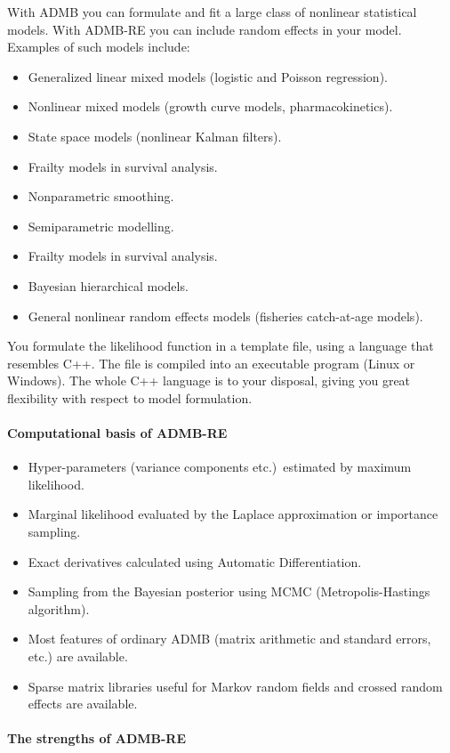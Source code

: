 \documentclass[12pt,letter,reqno]{book}
\begin{document}
With ADMB you can formulate and fit a large class of nonlinear statistical
models. With ADMB-RE you can include random effects in your model. Examples of such models include:
\begin{itemize}
\item Generalized linear mixed models (logistic and Poisson regression).
\item Nonlinear mixed models (growth curve models, pharmacokinetics).
\item State space models (nonlinear Kalman filters).
\item Frailty models in survival analysis.
\item Nonparametric smoothing.
\item Semiparametric modelling.
\item Frailty models in survival analysis.
\item Bayesian hierarchical models.
\item General nonlinear random effects models (fisheries catch-at-age
models).
\end{itemize}
You formulate the likelihood function in a template file, using a language that resembles C++. The file is
compiled into an executable program (Linux or Windows). The whole C++ language is to your disposal, giving you
great flexibility with respect to model formulation.

\paragraph{Computational basis of ADMB-RE}

\begin{itemize}
\item Hyper-parameters (variance components etc.)~estimated by maximum likelihood.
\item Marginal likelihood evaluated by the Laplace approximation or importance sampling.
\item Exact derivatives calculated using Automatic Differentiation.
\item Sampling from the Bayesian posterior using MCMC (Metropolis-Hastings algorithm).
\item Most features of ordinary ADMB (matrix arithmetic and standard errors, etc.) are available.
\item Sparse matrix libraries useful for Markov random fields and crossed random effects are available.
\end{itemize}

\paragraph{The strengths of ADMB-RE}
\end{document}
